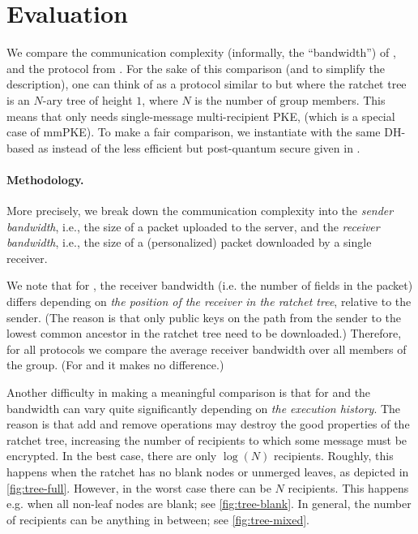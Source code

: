 
\section{Evaluation}\label{sec:eval}
We compare the communication complexity (informally, the ``bandwidth'') of \saik, \protITK and the \protCMPKE
protocol from \cite{hashimoto2021cmpke}. For the sake of this comparison (and to simplify the description), one
can think of \protCMPKE as a protocol similar to \saik but where the ratchet tree is an $N$-ary tree of height $1$, where $N$ is the number of group members.
This means that \protCMPKE only needs single-message multi-recipient PKE, \mPKE (which is a special case of mmPKE).
To make a fair comparison, we instantiate \protCMPKE with the same DH-based \mPKE as \saik
instead of the less efficient but post-quantum secure \mPKE
given in \cite{hashimoto2021cmpke}.


\paragraph{Methodology.}
More precisely, we break down the communication complexity into the \emph{sender bandwidth}, i.e., the size of a packet uploaded to the server, and the \emph{receiver bandwidth}, i.e., the size of a (personalized) packet downloaded by a single receiver.

We note that for \saik, the receiver bandwidth (i.e. the number of fields in the packet) differs depending on \emph{the position of the receiver in the ratchet tree}, relative to the sender. (The reason is that only public keys on the path from the sender to the lowest common ancestor in the ratchet tree need to be downloaded.) Therefore, for all protocols we compare the average receiver bandwidth over all members of the group. (For \protITK and \protCMPKE it makes no difference.)

Another difficulty in making a meaningful comparison is that for \saik and \protITK the bandwidth can vary quite
significantly depending on \emph{the execution history}. The reason is that add and remove operations may destroy the
good properties of the ratchet tree, increasing the number of recipients to which some message must be encrypted. In the
best case, there are only $\log(N)$ recipients. Roughly, this happens when the ratchet has no blank nodes or unmerged
leaves, as depicted in \cref{fig:tree-full}. However, in the worst case there can be $N$ recipients. This happens e.g. when all
non-leaf nodes are blank; see \cref{fig:tree-blank}. In general, the number of recipients can be anything in between;
see \cref{fig:tree-mixed}.


